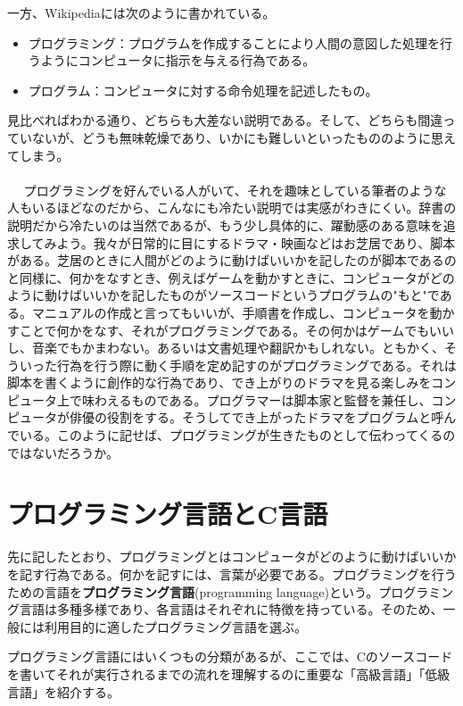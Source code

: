 一方、Wikipediaには次のように書かれている。
\begin{itemize}
\item プログラミング：プログラムを作成することにより人間の意図した処理を行うようにコンピュータに指示を与える行為である。
\item プログラム：コンピュータに対する命令処理を記述したもの。
\end{itemize}
見比べればわかる通り、どちらも大差ない説明である。そして、どちらも間違っていないが、どうも無味乾燥であり、いかにも難しいといったもののように思えてしまう。
\\ \\　
プログラミングを好んでいる人がいて、それを趣味としている筆者のような人もいるほどなのだから、こんなにも冷たい説明では実感がわきにくい。辞書の説明だから冷たいのは当然であるが、もう少し具体的に、躍動感のある意味を追求してみよう。我々が日常的に目にするドラマ・映画などはお芝居であり、脚本がある。芝居のときに人間がどのように動けばいいかを記したのが脚本であるのと同様に、何かをなすとき、例えばゲームを動かすときに、コンピュータがどのように動けばいいかを記したものがソースコードというプログラムの"もと"である。マニュアルの作成と言ってもいいが、手順書を作成し、コンピュータを動かすことで何かをなす、それがプログラミングである。その何かはゲームでもいいし、音楽でもかまわない。あるいは文書処理や翻訳かもしれない。ともかく、そういった行為を行う際に動く手順を定め記すのがプログラミングである。それは脚本を書くように創作的な行為であり、でき上がりのドラマを見る楽しみをコンピュータ上で味わえるものである。プログラマーは脚本家と監督を兼任し、コンピュータが俳優の役割をする。そうしてでき上がったドラマをプログラムと呼んでいる。このように記せば、プログラミングが生きたものとして伝わってくるのではないだろうか。

\section{プログラミング言語とC言語}
先に記したとおり、プログラミングとはコンピュータがどのように動けばいいかを記す行為である。何かを記すには、言葉が必要である。プログラミングを行うための言語を\textbf{プログラミング言語}(programming language)という。プログラミング言語は多種多様であり、各言語はそれぞれに特徴を持っている。そのため、一般には利用目的に適したプログラミング言語を選ぶ。

プログラミング言語にはいくつもの分類があるが、ここでは、Cのソースコードを書いてそれが実行されるまでの流れを理解するのに重要な「高級言語」「低級言語」を紹介する。
